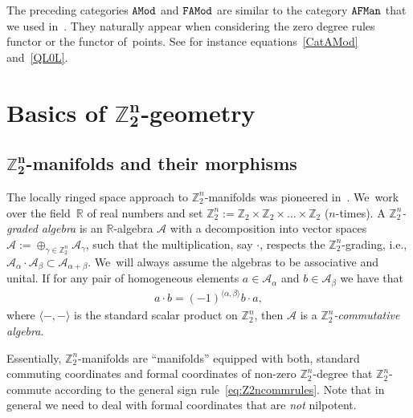 \documentclass[pdftex]{sigma}%
\newcommand{\R}{{\mathbb R}}
\newcommand{\Z}{{\mathbb Z}}
\newcommand{\0}{\otimes}
\numberwithin{equation}{section}
\begin{document}
The preceding categories $\tt AMod$ and $\tt FAMod$ are similar to the category $\tt AFMan$ that we used in~\cite{Bruce:2019b}. They naturally appear when considering the zero degree rules functor or the functor of~points. See for instance equations~\eqref{CatAMod} and~\eqref{QL0L}.
%
\section[Basics of Z2n-geometry]
{Basics of $\boldsymbol{\Z_2^n}$-geometry}\label{app:ZZnGeom}

\subsection[Z2n-manifolds and their morphisms]
{$\boldsymbol{\Z_2^n}$-manifolds and their morphisms}

The locally ringed space approach to $\Z_{2}^{n}$-manifolds was pioneered in~\cite{Covolo:2016}. We~work over the field~$\R$ of real numbers and set $\Z_2^n := \Z_2 \times \Z_2 \times \dots\times\Z_2$ ($n$-times). A \emph{$\Z_2^n$-graded algebra} is an $\R$-algebra $\mathcal{A}$ with a decomposition into vector spaces $\mathcal{A} := \oplus_{\gamma \in \Z_2^n} \mathcal{A}_\gamma$, such that the multiplication, say $\cdot$, respects the $\Z_2^n$-grading, i.e., $\mathcal{A}_\alpha \cdot \mathcal{A}_\beta \subset \mathcal{A}_{\alpha + \beta}$. We~will always assume the algebras to be associative and unital. If for any pair of homogeneous elements $a \in \mathcal{A}_\alpha$ and $b \in \mathcal{A}_\beta$ we have that
%
\begin{gather}\label{eq:Z2ncommrules}
a \cdot b = (-1)^{\langle \alpha , \beta\rangle } b \cdot a,
\end{gather}
%
where $\langle -, -\rangle$ is the standard scalar product on $\Z_2^n$, then $\mathcal{A}$ is a \emph{$\Z_2^n$-commutative algebra}.

Essentially, $\Z_2^n$-manifolds are ``manifolds'' equipped with both, standard commuting coordinates and formal coordinates of non-zero $\Z_2^n$-degree that $\Z_2^n$-commute according to the general sign rule~\eqref{eq:Z2ncommrules}. Note that in general we need to deal with formal coordinates that are {\it not} nilpotent.
\end{document}
